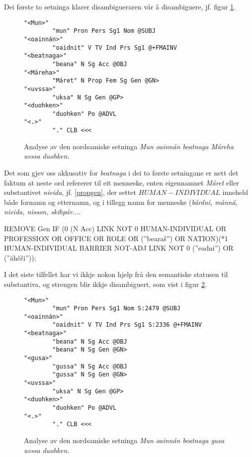 \documentclass[a4paper,norsk]{article}
\begin{document}
Dei første to setninga klarer disambigueraren vår å disambiguere, jf. figur \ref{Mareha}. %

\begin{figure}[htbp]
\begin{center}
\begin{verbatim}
"<Mun>" 
        "mun" Pron Pers Sg1 Nom @SUBJ
"<oainnán>"
        "oaidnit" V TV Ind Prs Sg1 @+FMAINV
"<beatnaga>" 
        "beana" N Sg Acc @OBJ
"<Máreha>" 
        "Máret" N Prop Fem Sg Gen @GN>
"<uvssa>" 
        "uksa" N Sg Gen @GP>
"<duohken>"
        "duohken" Po @ADVL
"<.>"
        "." CLB <<<
\end{verbatim}
\caption{Analyse av den nordsamiske setninga \textit{Mun oainnán beatnaga Máreha uvssa duohken.}}
\label{Mareha}
\end{center}
\end{figure}


Det som gjev oss akkusativ for \textit{beatnaga} i dei to første setningane er nett det faktum at neste ord refererer til eit menneske, enten eigennamnet \textit{Máret} eller substantivet \textit{nieida}, jf. \ref{propgen}, der settet $HUMAN-INDIVIDUAL$ inneheld både fornamn og etternamn, og i tillegg namn for menneske (\textit{bárdni, mánná, nieida, nisson, skihpár...}.   %

\begin{example}\label{propgen}
REMOVE Gen IF (0 (N Acc) LINK NOT 0 HUMAN-INDIVIDUAL OR PROFESSION OR OFFICE OR ROLE OR (''bearaš'') OR NATION)(*1 HUMAN-INDIVIDUAL BARRIER NOT-ADJ LINK NOT 0 (''eadni'') OR (''áhčči''));
\end{example}

I det siste tilfellet har vi ikkje nokon hjelp frå den semantiske statusen til substantiva, og strengen blir ikkje disambiguert, som vist i figur \ref{beatnaga}. %


\begin{figure}[htbp]
\begin{center}
\begin{verbatim}
"<Mun>" 
        "mun" Pron Pers Sg1 Nom S:2479 @SUBJ
"<oainnán>"
        "oaidnit" V TV Ind Prs Sg1 S:2336 @+FMAINV
"<beatnaga>"
        "beana" N Sg Acc @OBJ
        "beana" N Sg Gen @GN>
"<gusa>" 
        "gussa" N Sg Acc @OBJ
        "gussa" N Sg Gen @GN>
"<uvssa>"
        "uksa" N Sg Gen @GP>
"<duohken>"
        "duohken" Po @ADVL
"<.>"
        "." CLB <<<
\end{verbatim}
\caption{Analyse av den nordsamiske setninga \textit{Mun oainnán beatnaga gusa uvssa duohken.}}
\label{beatnaga}
\end{center}
\end{figure}
\end{document}
